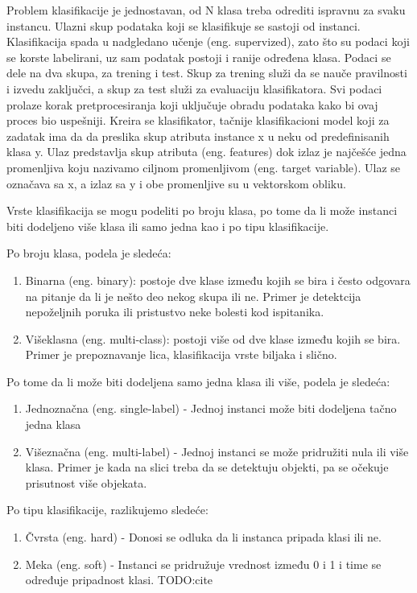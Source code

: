 \documentclass[12pt,oneside]{memoir}
\begin{document}
Problem klasifikacije je jednostavan, od N klasa treba odrediti ispravnu za svaku instancu. Ulazni skup podataka koji se klasifikuje se sastoji od instanci. Klasifikacija spada u nadgledano učenje (eng. supervized), zato što su podaci koji se korste labelirani, uz sam podatak postoji i ranije određena klasa. Podaci se dele na dva skupa, za trening i test. Skup za trening služi da se nauče pravilnosti i izvedu zaključci, a skup za test služi za evaluaciju klasifikatora. Svi podaci prolaze korak pretprocesiranja koji uključuje obradu podataka kako bi ovaj proces bio uspešniji. Kreira se klasifikator, tačnije klasifikacioni model koji za zadatak ima da da preslika skup atributa instance x u neku od predefinisanih klasa y. Ulaz predstavlja skup atributa (eng. features) dok izlaz je najčešće jedna promenljiva koju nazivamo ciljnom promenljivom (eng. target variable). Ulaz se označava sa x, a izlaz sa y i obe promenljive su u vektorskom obliku.

Vrste klasifikacija se mogu podeliti po broju klasa, po tome da li može instanci biti dodeljeno više klasa ili samo jedna kao i po tipu klasifikacije.

Po broju klasa, podela je sledeća:

\begin{enumerate}
\item Binarna (eng. binary): postoje dve klase između kojih se bira i često odgovara na pitanje da li je nešto deo nekog skupa ili ne. Primer je detektcija nepoželjnih poruka ili pristustvo neke bolesti kod ispitanika.
\item Višeklasna (eng. multi-class): postoji više od dve klase između kojih se bira. Primer je prepoznavanje lica, klasifikacija vrste biljaka i slično. 
\end{enumerate}

Po tome da li može biti dodeljena samo jedna klasa ili više, podela je sledeća:

\begin{enumerate}
\item Jednoznačna (eng. single-label) - Jednoj instanci može biti dodeljena tačno jedna klasa
\item Višeznačna (eng.  multi-label) - Jednoj instanci se može pridružiti nula ili više klasa. Primer je kada na slici treba da se detektuju objekti, pa se očekuje prisutnost više objekata.
\end{enumerate}

Po tipu klasifikacije, razlikujemo sledeće:

\begin{enumerate}
\item Čvrsta (eng. hard) - Donosi se odluka da li instanca pripada klasi ili ne. 
\item Meka (eng. soft) - Instanci se pridružuje vrednost između 0 i 1 i time se određuje pripadnost klasi. TODO:cite
\end{enumerate}
\end{document}
